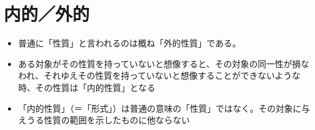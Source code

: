 \documentclass[a4paper]{jsarticle}
\begin{document}
\section{内的／外的}
\begin{itemize}
	\item 普通に「性質」と言われるのは概ね「外的性質」である。
	\item ある対象がその性質を持っていないと想像すると、その対象の同一性が損なわれ、それゆえその性質を持っていないと想像することができないような時、その性質は「内的性質」となる
	\item 「内的性質」（＝「形式」）は普通の意味の「性質」ではなく。その対象に与えうる性質の範囲を示したものに他ならない
\end{itemize}
\end{document}
